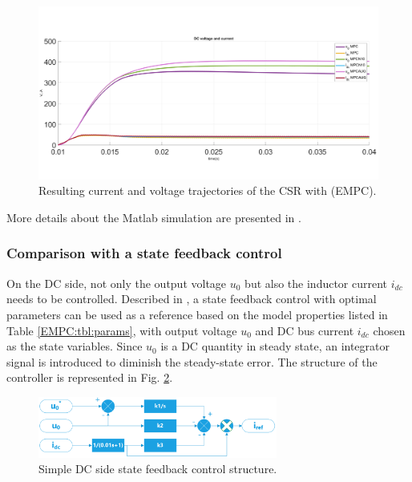     \begin{figure}[!ht]
        \centering
        \includegraphics[width=\textwidth]{EMPC_PNG_Pics/Results.png}
        \caption{Resulting current and voltage trajectories of the CSR with (EMPC).}
        \label{EMPC:fig:Result_PerformanceEMPC}
    \end{figure}

    More details about the Matlab simulation are presented in \cite{neukirchner2019linkedmodel}.

    \subsubsection{Comparison with a state feedback control}\label{EMPC:sec:Comparison}

    On the DC side, not only the output voltage $u_0$ but also the inductor current $i_{dc}$ needs to be controlled. Described in \cite{zhang2015simplified}, a state feedback control with optimal parameters can be used as a reference based on the model properties listed in Table \ref{EMPC:tbl:params}, with output voltage $u_0$ and DC bus current $i_{dc}$ chosen as the state variables. Since $u_0$ is a DC quantity in steady state, an integrator signal is introduced to diminish the steady-state error. The structure of the controller is represented in Fig. \ref{EMPC:fig:SFeedbackDC}.

    \begin{figure}[!ht]
        \centering
        \includegraphics[width=0.7\textwidth]{EMPC_PNG_Pics/SFchart.png}
        \caption{Simple DC side state feedback control structure.}
        \label{EMPC:fig:SFeedbackDC}
    \end{figure}

